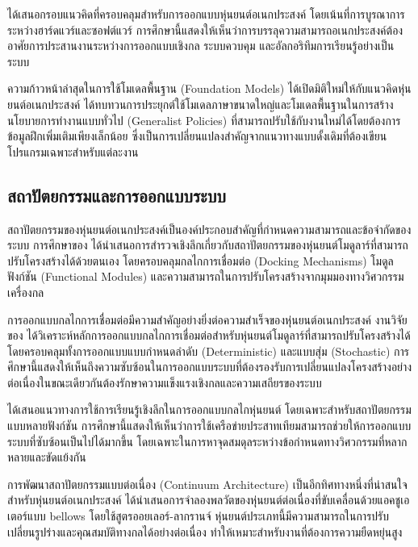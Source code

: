 \documentclass[a4paper]{article}
\begin{document}
\textcite{seo2019modular} ได้เสนอกรอบแนวคิดที่ครอบคลุมสำหรับการออกแบบหุ่นยนต์อเนกประสงค์ โดยเน้นที่การบูรณาการระหว่างฮาร์ดแวร์และซอฟต์แวร์ การศึกษานี้แสดงให้เห็นว่าการบรรลุความสามารถอเนกประสงค์ต้องอาศัยการประสานงานระหว่างการออกแบบเชิงกล ระบบควบคุม และอัลกอริทึมการเรียนรู้อย่างเป็นระบบ

ความก้าวหน้าล่าสุดในการใช้โมเดลพื้นฐาน (Foundation Models) ได้เปิดมิติใหม่ให้กับแนวคิดหุ่นยนต์อเนกประสงค์ \textcite{wang2023robot} ได้ทบทวนการประยุกต์ใช้โมเดลภาษาขนาดใหญ่และโมเดลพื้นฐานในการสร้างนโยบายการทำงานแบบทั่วไป (Generalist Policies) ที่สามารถปรับใช้กับงานใหม่ได้โดยต้องการข้อมูลฝึกเพิ่มเติมเพียงเล็กน้อย ซึ่งเป็นการเปลี่ยนแปลงสำคัญจากแนวทางแบบดั้งเดิมที่ต้องเขียนโปรแกรมเฉพาะสำหรับแต่ละงาน

\subsection{สถาปัตยกรรมและการออกแบบระบบ}

สถาปัตยกรรมของหุ่นยนต์อเนกประสงค์เป็นองค์ประกอบสำคัญที่กำหนดความสามารถและข้อจำกัดของระบบ การศึกษาของ \textcite{post2023modular} ได้นำเสนอการสำรวจเชิงลึกเกี่ยวกับสถาปัตยกรรมของหุ่นยนต์โมดูลาร์ที่สามารถปรับโครงสร้างได้ด้วยตนเอง โดยครอบคลุมกลไกการเชื่อมต่อ (Docking Mechanisms) โมดูลฟังก์ชัน (Functional Modules) และความสามารถในการปรับโครงสร้างจากมุมมองทางวิศวกรรมเครื่องกล

การออกแบบกลไกการเชื่อมต่อมีความสำคัญอย่างยิ่งต่อความสำเร็จของหุ่นยนต์อเนกประสงค์ งานวิจัยของ \textcite{liang2025decoding} ได้วิเคราะห์หลักการออกแบบกลไกการเชื่อมต่อสำหรับหุ่นยนต์โมดูลาร์ที่สามารถปรับโครงสร้างได้ โดยครอบคลุมทั้งการออกแบบแบบกำหนดลำดับ (Deterministic) และแบบสุ่ม (Stochastic) การศึกษานี้แสดงให้เห็นถึงความซับซ้อนในการออกแบบระบบที่ต้องรองรับการเปลี่ยนแปลงโครงสร้างอย่างต่อเนื่องในขณะเดียวกันต้องรักษาความแข็งแรงเชิงกลและความเสถียรของระบบ

\textcite{krishnan2023deep} ได้เสนอแนวทางการใช้การเรียนรู้เชิงลึกในการออกแบบกลไกหุ่นยนต์ โดยเฉพาะสำหรับสถาปัตยกรรมแบบหลายฟังก์ชัน การศึกษานี้แสดงให้เห็นว่าการใช้เครือข่ายประสาทเทียมสามารถช่วยให้การออกแบบระบบที่ซับซ้อนเป็นไปได้มากขึ้น โดยเฉพาะในการหาจุดสมดุลระหว่างข้อกำหนดทางวิศวกรรมที่หลากหลายและขัดแย้งกัน

การพัฒนาสถาปัตยกรรมแบบต่อเนื่อง (Continuum Architecture) เป็นอีกทิศทางหนึ่งที่น่าสนใจสำหรับหุ่นยนต์อเนกประสงค์ \textcite{ieee2023dynamic} ได้นำเสนอการจำลองพลวัตของหุ่นยนต์ต่อเนื่องที่ขับเคลื่อนด้วยแอคชูเอเตอร์แบบ bellows โดยใช้สูตรออยเลอร์-ลากรานจ์ หุ่นยนต์ประเภทนี้มีความสามารถในการปรับเปลี่ยนรูปร่างและคุณสมบัติทางกลได้อย่างต่อเนื่อง ทำให้เหมาะสำหรับงานที่ต้องการความยืดหยุ่นสูง
\end{document}
